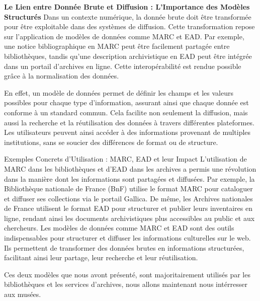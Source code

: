 \textbf{Le Lien entre Donnée Brute et Diffusion : L'Importance des Modèles Structurés}
Dans un contexte numérique, la donnée brute doit être transformée pour être exploitable dans des systèmes de diffusion. Cette transformation repose sur l’application de modèles de données comme MARC et EAD. Par exemple, une notice bibliographique en MARC peut être facilement partagée entre bibliothèques, tandis qu'une description archivistique en EAD peut être intégrée dans un portail d'archives en ligne. Cette interopérabilité est rendue possible grâce à la normalisation des données.\newline

En effet, un modèle de données permet de définir les champs et les valeurs possibles pour chaque type d'information, assurant ainsi que chaque donnée est conforme à un standard commun. Cela facilite non seulement la diffusion, mais aussi la recherche et la réutilisation des données à travers différentes plateformes. Les utilisateurs peuvent ainsi accéder à des informations provenant de multiples institutions, sans se soucier des différences de format ou de structure. \newline

Exemples Concrets d'Utilisation : MARC, EAD et leur Impact
L'utilisation de MARC dans les bibliothèques et d'EAD dans les archives a permis une révolution dans la manière dont les informations sont partagées et diffusées. Par exemple, la Bibliothèque nationale de France (BnF) utilise le format MARC pour cataloguer et diffuser ses collections via le portail Gallica. De même, les Archives nationales de France utilisent le format EAD pour structurer et publier leurs inventaires en ligne, rendant ainsi les documents archivistiques plus accessibles au public et aux chercheurs.\newline
Les modèles de données comme MARC et EAD sont des outils indispensables pour structurer et diffuser les informations culturelles sur le web. Ils permettent de transformer des données brutes en informations structurées, facilitant ainsi leur partage, leur recherche et leur réutilisation.\newline

Ces deux modèles que nous avont présenté, sont majoritairement utilisés par les bibliothèques et les services d'archives, nous allons maintenant nous intérresser aux musées.

